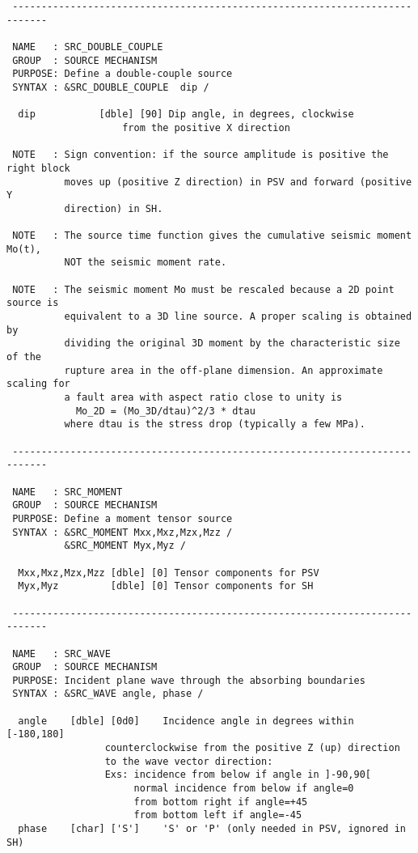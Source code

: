 \begin{verbatim}
 ----------------------------------------------------------------------------

 NAME   : SRC_DOUBLE_COUPLE
 GROUP  : SOURCE MECHANISM
 PURPOSE: Define a double-couple source
 SYNTAX : &SRC_DOUBLE_COUPLE  dip /

  dip           [dble] [90] Dip angle, in degrees, clockwise 
                    from the positive X direction
                     
 NOTE   : Sign convention: if the source amplitude is positive the right block
          moves up (positive Z direction) in PSV and forward (positive Y 
          direction) in SH.

 NOTE   : The source time function gives the cumulative seismic moment Mo(t), 
          NOT the seismic moment rate.

 NOTE   : The seismic moment Mo must be rescaled because a 2D point source is 
          equivalent to a 3D line source. A proper scaling is obtained by 
          dividing the original 3D moment by the characteristic size of the 
          rupture area in the off-plane dimension. An approximate scaling for
          a fault area with aspect ratio close to unity is
            Mo_2D = (Mo_3D/dtau)^2/3 * dtau
          where dtau is the stress drop (typically a few MPa).

 ----------------------------------------------------------------------------

 NAME   : SRC_MOMENT
 GROUP  : SOURCE MECHANISM
 PURPOSE: Define a moment tensor source
 SYNTAX : &SRC_MOMENT Mxx,Mxz,Mzx,Mzz /
          &SRC_MOMENT Myx,Myz /

  Mxx,Mxz,Mzx,Mzz [dble] [0] Tensor components for PSV
  Myx,Myz         [dble] [0] Tensor components for SH
                     
 ----------------------------------------------------------------------------

 NAME   : SRC_WAVE
 GROUP  : SOURCE MECHANISM
 PURPOSE: Incident plane wave through the absorbing boundaries
 SYNTAX : &SRC_WAVE angle, phase /

  angle    [dble] [0d0]    Incidence angle in degrees within [-180,180]
                 counterclockwise from the positive Z (up) direction
                 to the wave vector direction:
                 Exs: incidence from below if angle in ]-90,90[
                      normal incidence from below if angle=0 
                      from bottom right if angle=+45 
                      from bottom left if angle=-45 
  phase    [char] ['S']    'S' or 'P' (only needed in PSV, ignored in SH)


\end{verbatim}
